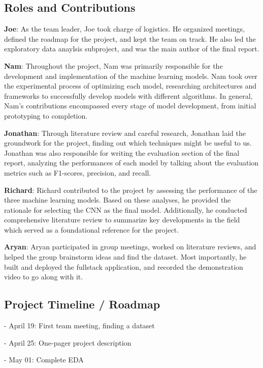 \documentclass[conference]{IEEEtran}
\begin{document}
\subsection{\large Roles and Contributions}
\balance

\textbf{Joe}: As the team leader, Joe took charge of logistics. He organized meetings, defined the roadmap for the project, and kept the team on track. He also led the exploratory data anaylsis subproject, and was the main author of the final report. 

\textbf{Nam}: Throughout the project, Nam was primarily responsible for the development and implementation of the machine learning models. Nam took over the experimental process of optimizing each model, researching architectures and frameworks to successfully develop models with different algorithms. In general, Nam's contributions encompassed every stage of model development, from initial prototyping to completion.

\textbf{Jonathan}: Through literature review and careful research, Jonathan laid the groundwork for the project, finding out which techniques might be useful to us. Jonathan was also responsible for writing the evaluation section of the final report, analyzing the performances of each model by talking about the evaluation metrics such as F1-scores, precision, and recall.

\textbf{Richard}: Richard contributed to the project by assessing the performance of the three machine learning models. Based on these analyses, he provided the rationale for selecting the CNN as the final model. Additionally, he conducted comprehensive literature review to summarize key developments in the field which served as a foundational reference for the project. 

\textbf{Aryan}: Aryan participated in group meetings, worked on literature reviews, and helped the group brainstorm ideas and find the dataset. Most importantly, he built and deployed the fullstack application, and recorded the demonstration video to go along with it. 

\subsection{\large Project Timeline / Roadmap}

- April 19: First team meeting, finding a dataset

- April 25: One-pager project description 

- May 01: Complete EDA
\end{document}
